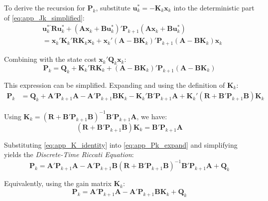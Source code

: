 \documentclass[12pt, a4paper]{article}
\begin{document}
To derive the recursion for $\bm{P}_k$, substitute 
$\bm{u}_k^* = -\bm{K}_k \bm{x}_k$ into the deterministic part of 
\eqref{eq:app_Jk_simplified}:
\begin{align}
    &\bm{u}_k^{*'} \bm{R} \bm{u}_k^* + 
    (\bm{A}\bm{x}_k + \bm{B}\bm{u}_k^*)' \bm{P}_{k+1} 
    (\bm{A}\bm{x}_k + \bm{B}\bm{u}_k^*) \nonumber \\
    &= \bm{x}_k' \bm{K}_k' \bm{R} \bm{K}_k \bm{x}_k + 
    \bm{x}_k' (\bm{A} - \bm{B}\bm{K}_k)' \bm{P}_{k+1} 
    (\bm{A} - \bm{B}\bm{K}_k) \bm{x}_k
    \label{eq:app_substitute_optimal}
\end{align}

Combining with the state cost $\bm{x}_k' \bm{Q}_k \bm{x}_k$:
\begin{equation}
    \bm{P}_k = \bm{Q}_k + \bm{K}_k' \bm{R} \bm{K}_k + 
    (\bm{A} - \bm{B}\bm{K}_k)' \bm{P}_{k+1} (\bm{A} - \bm{B}\bm{K}_k)
    \label{eq:app_Pk_form1}
\end{equation}

This expression can be simplified. Expanding and using the 
definition of $\bm{K}_k$:
\begin{align}
    \bm{P}_k &= \bm{Q}_k + \bm{A}' \bm{P}_{k+1} \bm{A} - 
    \bm{A}' \bm{P}_{k+1} \bm{B} \bm{K}_k - 
    \bm{K}_k' \bm{B}' \bm{P}_{k+1} \bm{A} + 
    \bm{K}_k' (\bm{R} + \bm{B}' \bm{P}_{k+1} \bm{B}) \bm{K}_k
    \label{eq:app_Pk_expand}
\end{align}

Using $\bm{K}_k = (\bm{R} + \bm{B}' \bm{P}_{k+1} \bm{B})^{-1} 
\bm{B}' \bm{P}_{k+1} \bm{A}$, we have:
\begin{equation}
    (\bm{R} + \bm{B}' \bm{P}_{k+1} \bm{B}) \bm{K}_k = 
    \bm{B}' \bm{P}_{k+1} \bm{A}
    \label{eq:app_K_identity}
\end{equation}

Substituting \eqref{eq:app_K_identity} into 
\eqref{eq:app_Pk_expand} and simplifying yields the 
\textit{Discrete-Time Riccati Equation}:
\begin{equation}
    \boxed{\bm{P}_k = \bm{A}' \bm{P}_{k+1} \bm{A} - 
    \bm{A}' \bm{P}_{k+1} \bm{B} 
    (\bm{R} + \bm{B}' \bm{P}_{k+1} \bm{B})^{-1} 
    \bm{B}' \bm{P}_{k+1} \bm{A} + \bm{Q}_k}
    \label{eq:app_riccati}
\end{equation}

Equivalently, using the gain matrix $\bm{K}_k$:
\begin{equation}
    \bm{P}_k = \bm{A}' \bm{P}_{k+1} \bm{A} - 
    \bm{A}' \bm{P}_{k+1} \bm{B} \bm{K}_k + \bm{Q}_k
    \label{eq:app_riccati_alt}
\end{equation}
\end{document}
